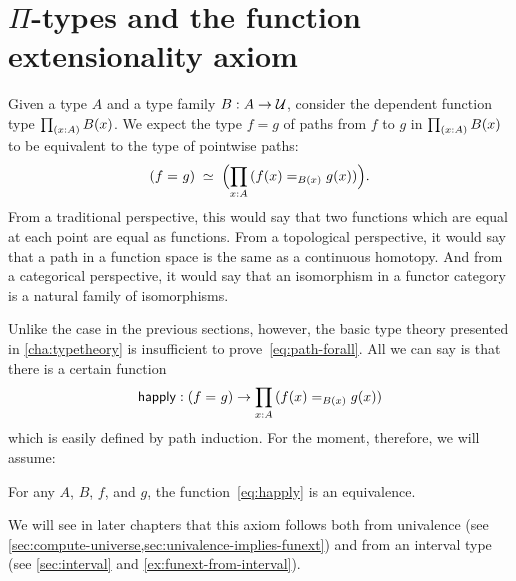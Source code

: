 %

\section{\texorpdfstring{$\Pi$}{Π}-types and the function extensionality axiom}
\label{sec:compute-pi}

%
%
%
Given a type $A$ and a type family $B : A \to \mathcal{U}$, consider the dependent function type $\prd{x:A}B(x)$.
We expect the type $f=g$ of paths from $f$ to $g$ in $\prd{x:A} B(x)$ to be equivalent to 
the type of pointwise paths:
\begin{equation}
  \eqvspaced{(\id{f}{g})}{\Parens{\prd{x:A} (\id[B(x)]{f(x)}{g(x)})}}.\label{eq:path-forall}
\end{equation}
From a traditional perspective, this would say that two functions which are equal at each point are equal as functions.
%
From a topological perspective, it would say that a path in a function space is the same as a continuous homotopy.
%
And from a categorical perspective, it would say that an isomorphism in a functor category is a natural family of isomorphisms.

Unlike the case in the previous sections, however, the basic type theory presented in \autoref{cha:typetheory} is insufficient to prove~\eqref{eq:path-forall}.
All we can say is that there is a certain function
\begin{equation}\label{eq:happly}
  \happly : (\id{f}{g}) \to \prd{x:A} (\id[B(x)]{f(x)}{g(x)})
\end{equation}
which is easily defined by path induction.
For the moment, therefore, we will assume:

\begin{axiom}\label{axiom:funext}
  For any $A$, $B$, $f$, and $g$, the function~\eqref{eq:happly} is an equivalence.
\end{axiom}

We will see in later chapters that this axiom follows both from univalence (see \autoref{sec:compute-universe,sec:univalence-implies-funext}) and from an interval type (see \autoref{sec:interval} and \autoref{ex:funext-from-interval}).

